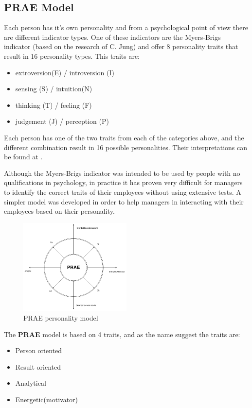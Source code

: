 \subsection{PRAE Model}
\label{subsec:prae}

Each person has it's own personality and from a psychological point of view there are different indicator types. One of these indicators are the Myers-Brigs indicator \cite{myers} (based on the research of C. Jung) and offer 8 personality traits that result in 16 personality types. This traits are:
\begin{itemize}
\item extroversion(E) / introversion (I)
\item sensing (S) / intuition(N)
\item thinking (T) / feeling (F) 
\item judgement (J) / perception (P)
\end{itemize}
Each person has one of the two traits from each of the categories above, and the different combination result in 16 possible personalities. Their interpretations can be found at \cite{mbf}.

Although the Myers-Brigs indicator was intended to be used by people with no qualifications in psychology, in practice it has proven very difficult for managers to identify the correct traits of their employees without using extensive tests. A simpler model was developed in order to help managers in interacting with their employees based on their personality. 

\begin{figure}[h]
\centering
\includegraphics[width=0.5\textwidth]{img/prae.png}
\caption{PRAE personality model}
\label{fig:prae}
\end{figure}

The \textbf{PRAE} model is based on 4 traits, and as the name suggest the traits are:
\begin{itemize}
\item Person oriented
\item Result oriented
\item Analytical
\item Energetic(motivator)
\end{itemize}

